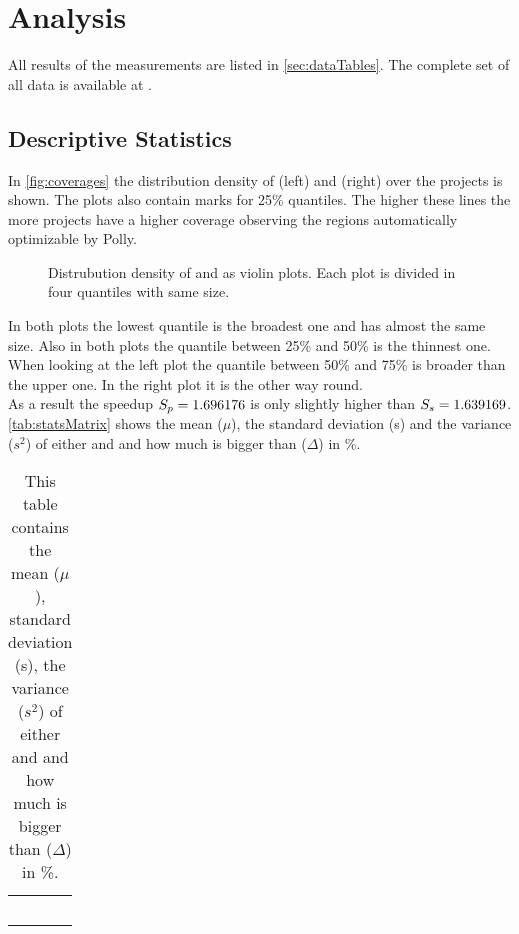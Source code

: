 \chapter{Analysis}
All results of the measurements are listed in \autoref{sec:dataTables}.
The complete set of all data is available at .

\section{Descriptive Statistics}
In \autoref{fig:coverages} the distribution density of \dyncovs (left) and \dyncovp (right) over the projects is shown.
The plots also contain marks for 25\% quantiles.
The higher these lines the more projects have a higher coverage observing the regions automatically optimizable by Polly.
\begin{figure}[!h]
    \caption[Distribution density of \dyncovs and \dyncovp]{
        Distrubution density of \dyncovs and \dyncovp as violin plots.
        Each plot is divided in four quantiles with same size.
    }
    
    \label{fig:coverages}
\end{figure}
In both plots the lowest quantile is the broadest one and has almost the same size.
Also in both plots the quantile between 25\% and 50\% is the thinnest one.
When looking at the left plot the quantile between 50\% and 75\% is broader than the upper one.
In the right plot it is the other way round.\\
As a result the speedup \(S_p=1.696176\) is only slightly higher than \(S_s=1.639169\).\\
\autoref{tab:statsMatrix} shows the mean (\(\mu\)), the standard deviation (s) and the variance (\(s^2\)) of either \dyncovp and \dyncovs and how much \dyncovp is bigger than \dyncovs (\(\Delta\)) in \%.
\begin{table}[!h]
    \myfloatalign
    \begin{tabularx}{\textwidth}{lCCC}
        \tableheadline{} &  & \tableheadline{\(\Delta\)} & \\\toprule
        \\\bottomrule
    \end{tabularx}
    \caption[Statistical evaluations of \dyncovp and \dyncovs]{
        This table contains the mean (\(\mu\)), standard deviation (s), the variance (\(s^2\)) of either \dyncovp and \dyncovs and how much \dyncovp is bigger than \dyncovs (\(\Delta\)) in \%.
    }
    \label{tab:statsMatrix}
\end{table}
